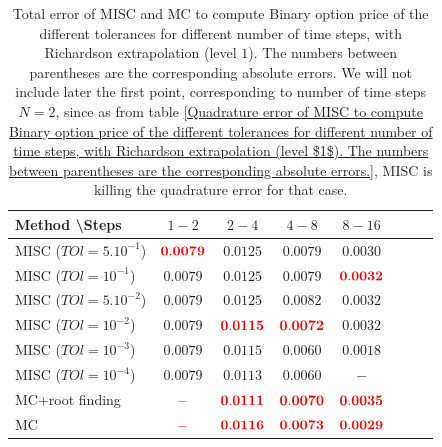 \documentclass[11pt]{article}
\begin{document}
\begin{table}[h!]
	\centering
	\begin{tabular}{l*{6}{c}r}
		Method \textbackslash  Steps            & $1-2$ & $2-4$ & $4-8$ & $8-16$  \\
		\hline
		MISC ($TOl=5.10^{-1}$)  &  $\mathbf{{\color{red}0.0079}}$ & $\mathbf{0.0125}$ & $\mathbf{0.0079}$ & $\mathbf{0.0030}$  \\
		MISC ($TOl=10^{-1}$)  &   $\mathbf{0.0079}$& $\mathbf{0.0125}$ & $\mathbf{0.0079}$ & $\mathbf{{\color{red}0.0032}}$  \\
		MISC ($TOl=5.10^{-2}$) &   $\mathbf{0.0079}$ & $\mathbf{0.0125}$ & $\mathbf{0.0082}$ & $\mathbf{0.0032}$  \\
		MISC ($TOl=10^{-2}$)  &   $\mathbf{0.0079}$ & $\mathbf{{\color{red}0.0115}}$ & $\mathbf{{\color{red}0.0072}}$ & $\mathbf{0.0032}$  \\
		MISC ($TOl=10^{-3}$) &   $\mathbf{0.0079}$ & $\mathbf{0.0115}$ & $\mathbf{0.0060}$ & $\mathbf{0.0018}$  \\

	MISC ($TOl=10^{-4}$) &   $\mathbf{0.0079}$ & $\mathbf{0.0113}$ & $\mathbf{0.0060}$ & $\mathbf{-}$  \\
		\hline
		MC+root finding   &  $\mathbf{{\color{red}-}}$ & $\mathbf{{\color{red}0.0111}}$ & $\mathbf{{\color{red}0.0070}}$ & $\mathbf{{\color{red}0.0035}}$  \\	
			MC    &  $\mathbf{{\color{red}-}}$ & $\mathbf{{\color{red}0.0116}}$ & $\mathbf{{\color{red}0.0073}}$ & $\mathbf{{\color{red}0.0029}}$  \\	
		\hline
		
	\end{tabular}
	\caption{Total error of MISC and MC to compute Binary option price of the different tolerances for different number of time steps, with Richardson extrapolation (level $1$). The numbers between parentheses are the corresponding absolute errors.  We will not include later the first point, corresponding to number of time steps $N=2$, since as from table \ref{Quadrature error of MISC to compute Binary option price of the different tolerances for different number of time steps, with Richardson extrapolation (level $1$). The numbers between parentheses are the corresponding absolute errors.}, MISC is killing the quadrature error for that case.}
	\label{Total error of MISC and MC to compute Binary option price of the different tolerances for different number of time steps, with Richardson extrapolation (level $1$). The numbers between parentheses are the corresponding absolute errors.}
\end{table}
\end{document}
